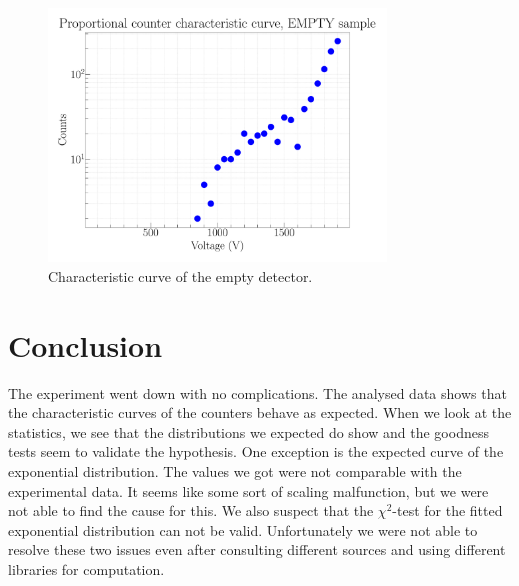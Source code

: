 \begin{figure}[H]
\centering
\includegraphics[width=0.8\textwidth]{../Figures/Proportional_characteristic_curve_EMPTY.pdf}
\caption{Characteristic curve of the empty detector.}
\label{fig:EmptyChar}
\end{figure}

\section{Conclusion}

The experiment went down with no complications. The analysed data shows that the characteristic curves of the counters behave as expected. When we look at the statistics, we see that the distributions we expected do show and the goodness tests seem to validate the hypothesis. One exception is the expected curve of the exponential distribution. The values we got were not comparable with the experimental data. It seems like some sort of scaling malfunction, but we were not able to find the cause for this. We also suspect that the $\chi^2$-test for the fitted exponential distribution can not be valid. Unfortunately we were not able to resolve these two issues even after consulting different sources and using different libraries for computation.


